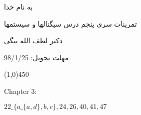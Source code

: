 \documentclass[50pt]{article}
\newcommand{\hl}{
\begin{center}
\line(1,0){450}
\end{center}}
\begin{document}
\setLTR 




\begin{RTL}
\Large{








\begin{center}
به نام خدا

تمرینات سری پنجم درس سیگنالها و سیستمها

دکتر لطف الله بیگی

مهلت تحویل: 98/1/25
\end{center}

\hl
\begin{latin}
Chapter 3:

$
22\_\Big\{a\_\{a,d\},b,c\Big\},24,26,40,41,47
$
\end{latin}






}





\end{RTL}
\end{document}
